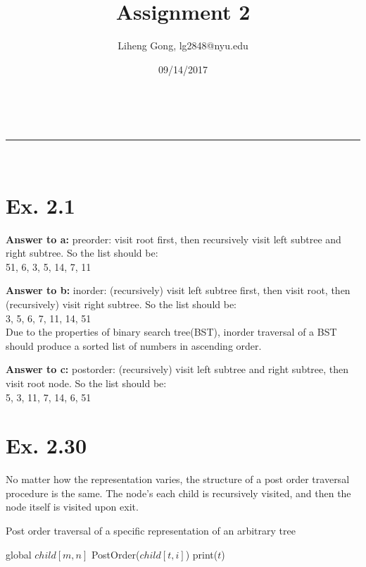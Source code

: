 \documentclass[a4paper,11pt]{article}
\makeatletter
\newcommand{\linia}{\rule{\linewidth}{0.5pt}}
\theoremstyle{mytheor}
\renewcommand{\maketitle}{
\begin{center}
\vspace{2ex}
{\huge \textsc{\@title}}
\vspace{1ex}
\\
\linia\\
\@author \hfill \@date
\vspace{4ex}
\end{center}
}
\makeatother
\begin{document}
\title{Assignment \textnumero{} 2}

\author{Liheng Gong, lg2848@nyu.edu}

\date{09/14/2017}

\maketitle

\section*{Ex. 2.1}
\noindent\textbf{Answer to a:} preorder: visit root first, then recursively visit left subtree and right subtree. So the list should be: \\51, 6, 3, 5, 14, 7, 11
\vspace{1.2in}


\noindent\textbf{Answer to b:} inorder: (recursively) visit left subtree first, then visit root, then (recursively) visit right subtree. So the list should be:\\ 3, 5, 6, 7, 11, 14, 51 \\Due to the properties of binary search tree(BST), inorder traversal of a BST should produce a sorted list of numbers in ascending order.
\vspace{1.2in}

\noindent\textbf{Answer to c:} postorder: (recursively) visit left subtree and right subtree, then visit root node. So the list should be: \\5, 3, 11, 7, 14, 6, 51

\vspace{1.2in}

\section*{Ex. 2.30}
No matter how the representation varies, the structure of a post order traversal procedure is the same. The node's each child is recursively visited, and then the node itself is visited upon exit.
\begin{algorithm}[H]
\caption{Post order traversal of a specific representation of an arbitrary tree}\label{POSTORDER_2_30}
\begin{algorithmic}[1]
\State global $child[m,n]$
 
   
    \State PostOrder($child[t, i]$) 
  \EndFor
  \State print($t$) 
\EndProcedure
\end{algorithmic}
\end{algorithm}
\end{document}
